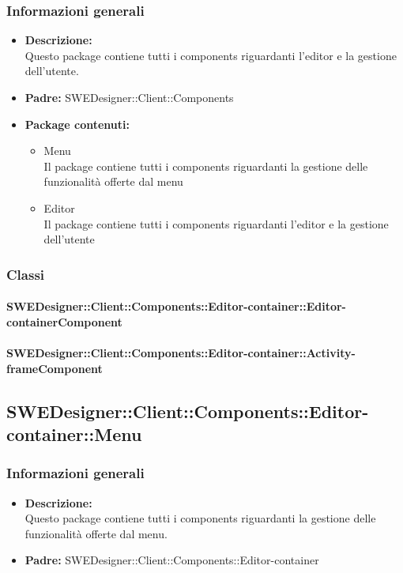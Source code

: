 		\subsubsection{Informazioni generali}
			\begin{itemize}
          		\item \textbf{Descrizione:}\\
          		Questo package contiene tutti i components riguardanti l'editor e la gestione dell'utente.
          		\item \textbf{Padre:} SWEDesigner::Client::Components
          		\item \textbf{Package contenuti:}\\
          		\begin{itemize}
          			\item Menu\\
          			Il package contiene tutti i components riguardanti la gestione delle funzionalità offerte dal menu
          			\item Editor\\
          			Il package contiene tutti i components riguardanti l'editor e la gestione dell'utente
          		\end{itemize}
          	\end{itemize}
          	
		\subsubsection{Classi}
		
			\paragraph{SWEDesigner::Client::Components::Editor-container::Editor-containerComponent}
				
				
			\paragraph{SWEDesigner::Client::Components::Editor-container::Activity-frameComponent}
				
				
	\subsection{SWEDesigner::Client::Components::Editor-container::Menu}
		\subsubsection{Informazioni generali}
			\begin{itemize}
          		\item \textbf{Descrizione:}\\
          		Questo package contiene tutti i components riguardanti la gestione delle funzionalità offerte dal menu.
          		\item \textbf{Padre:} SWEDesigner::Client::Components::Editor-container
          	\end{itemize}
          	
